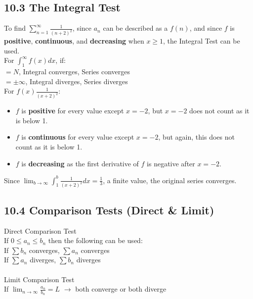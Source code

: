 \documentclass{article}
\begin{document}
        \subsection*{10.3 The Integral Test}
            To find $\sum_{n=1}^{\infty} \frac{1}{(n+2)^2}$, since $a_{n}$ can be described as a $f(n)$, and since $f$ is \textbf{positive}, \textbf{continuous}, and \textbf{decreasing} when \textbf{$x \geq 1$}, the Integral Test can be used. \\
            For $\int_{1}^{\infty} f(x)dx$, if: \\
            $ = N$, Integral converges, Series converges \\
            $ = \pm \infty$, Integral diverges, Series diverges \\
            For $f(x) \frac{1}{(x+2)^2}$: \\
            \begin{itemize}
                \item $f$ is \textbf{positive} for every value except $x=-2$, but $x=-2$ does not count as it is below 1. \\
                \item $f$ is \textbf{continuous} for every value except $x=-2$, but again, this does not count as it is below 1. \\
                \item $f$ is \textbf{decreasing} as the first derivative of $f$ is negative after $x=-2$. \\
            \end{itemize}
            Since $\lim_{b\to\infty} \int_{1}^{b} \frac{1}{(x+2)^2}dx = \frac{1}{3}$, a finite value, the original series converges. \\
        \color{Fuchsia}
        \subsection*{10.4 Comparison Tests (Direct \& Limit)}
            Direct Comparison Test \\
            If $0 \leq a_{n} \leq b_{n}$ then the following can be used: \\
            If $\sum b_{n}$ converges, $\sum a_{n}$ converges \\
            If $\sum a_{n}$ diverges, $\sum b_{n}$ diverges \\
            \\
            Limit Comparison Test \\
            If $\lim_{n\to\infty} \frac{a_{n}}{b_{n}} = L$ $\rightarrow$ both converge or both diverge \\
        \color{Black}
\end{document}
